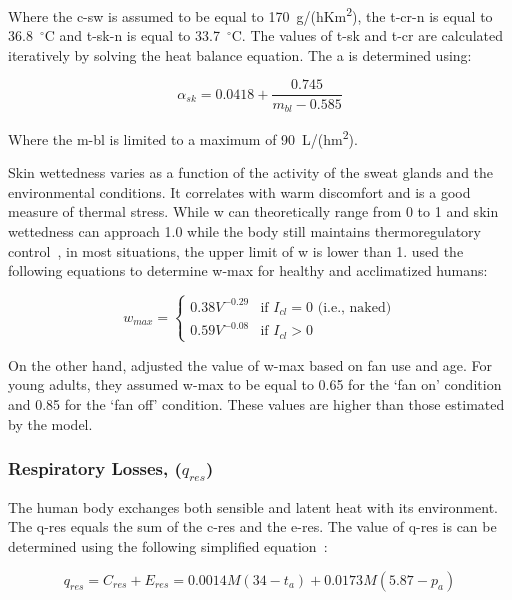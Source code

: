 Where the \ac{c-sw} is assumed to be equal to 170~g/(hKm\textsuperscript{2}), the \ac{t-cr-n} is equal to 36.8~$^{\circ}$C and \ac{t-sk-n} is equal to 33.7~$^{\circ}$C\@.
The values of \ac{t-sk} and \ac{t-cr} are calculated iteratively by solving the heat balance equation.
The \ac{a} is determined using:

\begin{equation}
    \alpha_{sk}=0.0418+\frac{0.745}{m_{b l}-0.585}\label{eq:alpha}
\end{equation}

Where the \ac{m-bl} is limited to a maximum of 90~L/(hm\textsuperscript{2}).

Skin wettedness varies as a function of the activity of the sweat glands and the environmental conditions.
It correlates with warm discomfort and is a good measure of thermal stress.
While \ac{w} can theoretically range from 0 to 1 and skin wettedness can approach 1.0 while the body still maintains thermoregulatory control~\cite{ASHRA2017}, in most situations, the upper limit of \ac{w} is lower than 1.
 used the following equations to determine \ac{w-max} for healthy and acclimatized humans:

\begin{equation}
    w_{max}=
\begin{cases}
    0.38 V^{-0.29} & \text{if } I_{cl} = 0 \text{ (i.e., naked)} \\
    0.59 V^{-0.08} & \text{if } I_{cl} > 0
\end{cases}
\end{equation}

On the other hand,  adjusted the value of \ac{w-max} based on fan use and age.
For young adults, they assumed \ac{w-max} to be equal to 0.65 for the `fan on' condition and 0.85 for the `fan off' condition.
These values are higher than those estimated by the  model.

\subsubsection{Respiratory Losses, ($q_{res}$)}
The human body exchanges both sensible and latent heat with its environment.
The \acf{q-res} equals the sum of the \ac{c-res} and the \ac{e-res}.
The value of \ac{q-res} is can be determined using the following simplified equation~\cite{ASHRA2017}:

\begin{equation}
    q_{res} = C_{res} + E_{res} = 0.0014M(34-t_{a}) + 0.0173M(5.87-p_{a})\label{eq:respiratory-losses}
\end{equation}

